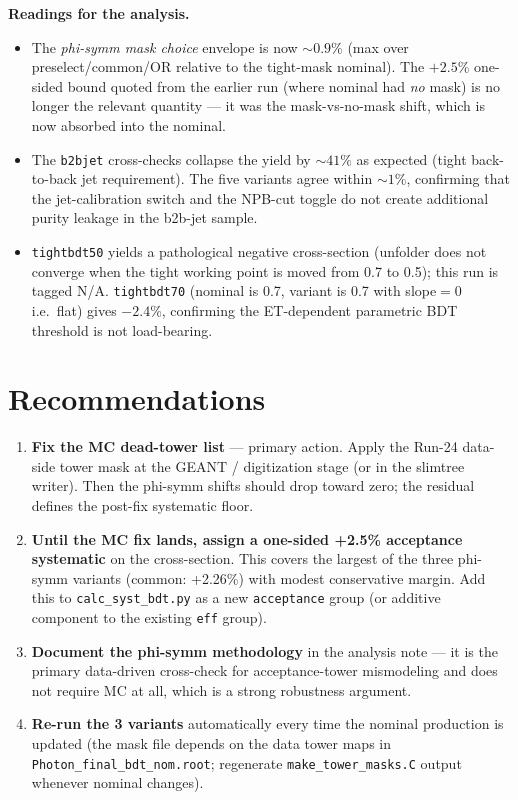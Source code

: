 \documentclass[11pt,a4paper]{article}
\begin{document}
\textbf{Readings for the analysis.}
\begin{itemize}
  \item The \emph{phi-symm mask choice} envelope is now
  $\sim 0.9\%$ (max over preselect/common/OR relative to the
  tight-mask nominal). The $+2.5\%$ one-sided bound quoted from the
  earlier run (where nominal had \emph{no} mask) is no longer the
  relevant quantity --- it was the mask-vs-no-mask shift, which is now
  absorbed into the nominal.
  \item The \texttt{b2bjet} cross-checks collapse the yield by
  $\sim 41\%$ as expected (tight back-to-back jet requirement).
  The five variants agree within $\sim 1\%$, confirming that the
  jet-calibration switch and the NPB-cut toggle do not create
  additional purity leakage in the b2b-jet sample.
  \item \texttt{tightbdt50} yields a pathological negative
  cross-section (unfolder does not converge when the tight working
  point is moved from 0.7 to 0.5); this run is tagged N/A.
  \texttt{tightbdt70} (nominal is 0.7, variant is 0.7 with
  slope$=0$ i.e.\ flat) gives $-2.4\%$, confirming the
  ET-dependent parametric BDT threshold is not load-bearing.
\end{itemize}

\section{Recommendations}

\begin{enumerate}
  \item \textbf{Fix the MC dead-tower list} --- primary action.
  Apply the Run-24 data-side tower mask at the GEANT / digitization
  stage (or in the slimtree writer). Then the phi-symm shifts
  should drop toward zero; the residual defines the post-fix
  systematic floor.

  \item \textbf{Until the MC fix lands, assign a one-sided
  \textbf{+2.5\% acceptance systematic}} on the cross-section. This
  covers the largest of the three phi-symm variants
  (common: +2.26\%) with modest conservative margin. Add this to
  \texttt{calc\_syst\_bdt.py} as a new \texttt{acceptance} group
  (or additive component to the existing \texttt{eff} group).

  \item \textbf{Document the phi-symm methodology} in the analysis
  note --- it is the primary data-driven cross-check for
  acceptance-tower mismodeling and does not require MC at all, which
  is a strong robustness argument.

  \item \textbf{Re-run the 3 variants} automatically every time the
  nominal production is updated (the mask file depends on the data
  tower maps in \texttt{Photon\_final\_bdt\_nom.root}; regenerate
  \texttt{make\_tower\_masks.C} output whenever nominal changes).
\end{enumerate}
\end{document}
